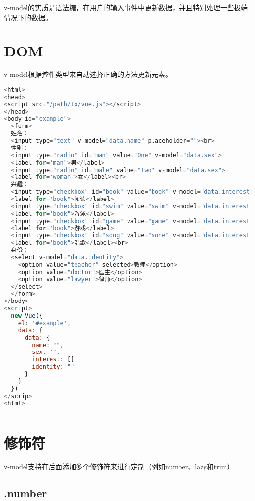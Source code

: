 v-model的实质是语法糖，在用户的输入事件中更新数据，并且特别处理一些极端情况下的数据。


\section{DOM}


v-model根据控件类型来自动选择正确的方法更新元素。


\begin{lstlisting}[language=JavaScript]
<html>
<head>
<script src="/path/to/vue.js"></script>
</head>
<body id="example">
  <form>
  姓名：
  <input type="text" v-model="data.name" placeholder=""><br>
  性别：
  <input type="radio" id="man" value="One" v-model="data.sex">
  <label for="man">男</label>
  <input type="radio" id="male" value="Two" v-model="data.sex">
  <label for="woman">女</label><br>
  兴趣：
  <input type="checkbox" id="book" value="book" v-model="data.interest">
  <label for="book">阅读</label>
  <input type="checkbox" id="swim" value="swim" v-model="data.interest">
  <label for="book">游泳</label>
  <input type="checkbox" id="game" value="game" v-model="data.interest">
  <label for="book">游戏</label>
  <input type="checkbox" id="song" value="sone" v-model="data.interest">
  <label for="book">唱歌</label><br>
  身份：
  <select v-model="data.identity">
    <option value="teacher" selected>教师</option>
    <option value="doctor">医生</option>
    <option value="lawyer">律师</option>
  </select>
  </form>
</body>
<script>
  new Vue({
    el: '#example',
    data: {
      data: {
        name: "",
        sex: "",
        interest: [],
        identity: ""
      }
    }
  })
</scrip>
<html>
\end{lstlisting}



\begin{lstlisting}[language=JavaScript]

\end{lstlisting}


\section{修饰符}

v-model支持在后面添加多个修饰符来进行定制（例如number、lazy和trim）


\subsection{.number}

